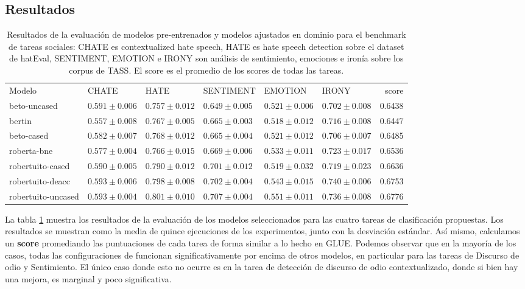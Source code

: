 \subsection{Resultados}


\begin{table}
    \centering
    \footnotesize
    \begin{tabular}{llllllr}
        \toprule
        Modelo             & CHATE             &  HATE             &  SENTIMENT        &  EMOTION          &  IRONY            &     score \\
        beto-uncased       & $0.591 \pm 0.006$ &  $0.757 \pm 0.012$ & $0.649 \pm 0.005$ & $0.521 \pm 0.006$ & $0.702 \pm 0.008$ &  0.6438 \\
        bertin             & $0.557 \pm 0.008$ &  $0.767 \pm 0.005$ & $0.665 \pm 0.003$ & $0.518 \pm 0.012$ & $0.716 \pm 0.008$ &  0.6447 \\
        beto-cased         & $0.582 \pm 0.007$ &  $0.768 \pm 0.012$ & $0.665 \pm 0.004$ & $0.521 \pm 0.012$ & $0.706 \pm 0.007$ &  0.6485 \\
        roberta-bne        & $0.577 \pm 0.004$ &  $0.766 \pm 0.015$ & $0.669 \pm 0.006$ & $0.533 \pm 0.011$ & $0.723 \pm 0.017$ &  0.6536 \\
        \hline
        robertuito-cased   & $0.590 \pm 0.005$ &  $0.790 \pm 0.012$ & $0.701 \pm 0.012$ & $0.519 \pm 0.032$ & $0.719 \pm 0.023$ &  0.6636 \\
        robertuito-deacc   & $0.593 \pm 0.006$ &  $0.798 \pm 0.008$ & $0.702 \pm 0.004$ & $0.543 \pm 0.015$ & $0.740 \pm 0.006$ &  0.6753 \\
        robertuito-uncased & $0.593 \pm 0.004$ &  $0.801 \pm 0.010$ & $0.707 \pm 0.004$ & $0.551 \pm 0.011$ & $0.736 \pm 0.008$ &  0.6776 \\
        \hline
    \end{tabular}
    \caption{Resultados de la evaluación de modelos pre-entrenados y modelos ajustados en dominio para el benchmark de tareas sociales: CHATE es contextualized hate speech, HATE es hate speech detection sobre el dataset de hatEval, SENTIMENT, EMOTION e IRONY son análisis de sentimiento, emociones e ironía sobre los corpus de TASS. El score es el promedio de los scores de todas las tareas.}
    \label{tab:robertuito_evaluation_results}
\end{table}


La tabla \ref{tab:robertuito_evaluation_results} muestra los resultados de la evaluación de los modelos seleccionados para las cuatro tareas de clasificación propuestas. Los resultados se muestran como la media de quince ejecuciones de los experimentos, junto con la desviación estándar. Así mismo, calculamos un \textbf{score} promediando las puntuaciones de cada tarea de forma similar a lo hecho en GLUE. Podemos observar que en la mayoría de los casos, todas las configuraciones de \robertuito{} funcionan significativamente por encima de otros modelos, en particular para las tareas de Discurso de odio y Sentimiento. El único caso donde esto no ocurre es en la tarea de detección de discurso de odio contextualizado, donde si bien hay una mejora, es marginal y poco significativa.

